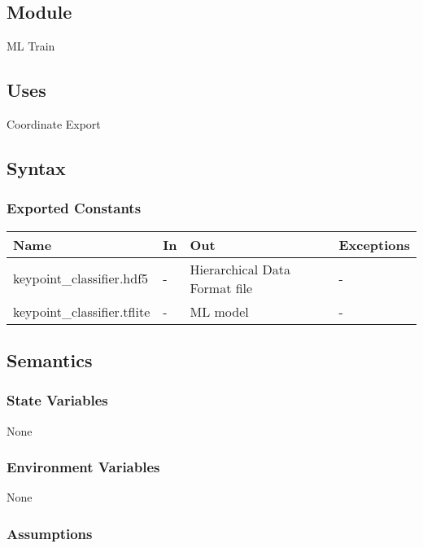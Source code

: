 \documentclass[12pt, titlepage]{article}
\begin{document}
\subsection{Module}

ML Train\\

\subsection{Uses}

Coordinate Export\\

\subsection{Syntax}

\subsubsection{Exported Constants}

\begin{center}
\begin{tabular}{p{5cm} p{1cm} p{4cm} p{2cm}}
\hline
\textbf{Name} & \textbf{In} & \textbf{Out} & \textbf{Exceptions} \\
\hline
keypoint_classifier.hdf5 & - & Hierarchical Data Format file & - \\
\hline
keypoint_classifier.tflite & - & ML model & - \\
\hline
\end{tabular}
\end{center}

\subsection{Semantics}

\subsubsection{State Variables}

None\\

\subsubsection{Environment Variables}

None\\

\subsubsection{Assumptions}
\end{document}
